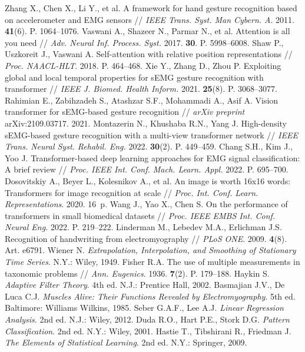 \documentclass[12pt,a4paper]{article}
\begin{document}
\begin{thebibliography}{99}
 Zhang X., Chen X., Li Y., et al. A framework for hand gesture recognition based on accelerometer and EMG sensors // \textit{IEEE Trans. Syst. Man Cybern. A}. 2011. \textbf{41}(6). P. 1064–1076.
 Vaswani A., Shazeer N., Parmar N., et al. Attention is all you need // \textit{Adv. Neural Inf. Process. Syst.} 2017. \textbf{30}. P. 5998–6008.
 Shaw P., Uszkoreit J., Vaswani A. Self-attention with relative position representations // \textit{Proc. NAACL-HLT}. 2018. P. 464–468.
 Xie Y., Zhang D., Zhou P. Exploiting global and local temporal properties for sEMG gesture recognition with transformer // \textit{IEEE J. Biomed. Health Inform.} 2021. \textbf{25}(8). P. 3068–3077.
 Rahimian E., Zabihzadeh S., Atashzar S.F., Mohammadi A., Asif A. Vision transformer for sEMG-based gesture recognition // \textit{arXiv preprint} arXiv:2109.03717. 2021.
 Montazerin N., Khushaba R.N., Yang J. High-density sEMG-based gesture recognition with a multi-view transformer network // \textit{IEEE Trans. Neural Syst. Rehabil. Eng.} 2022. \textbf{30}(2). P. 449–459.
 Chang S.H., Kim J., Yoo J. Transformer-based deep learning approaches for EMG signal classification: A brief review // \textit{Proc. IEEE Int. Conf. Mach. Learn. Appl.} 2022. P. 695–700.
 Dosovitskiy A., Beyer L., Kolesnikov A., et al. An image is worth 16x16 words: Transformers for image recognition at scale // \textit{Proc. Int. Conf. Learn. Representations}. 2020. 16~p.
 Wang J., Yao X., Chen S. On the performance of transformers in small biomedical datasets // \textit{Proc. IEEE EMBS Int. Conf. Neural Eng.} 2022. P. 219–222.
 Linderman M., Lebedev M.A., Erlichman J.S. Recognition of handwriting from electromyography // \textit{PLoS ONE}. 2009. \textbf{4}(8). Art. e6791.
 Wiener N. \textit{Extrapolation, Interpolation, and Smoothing of Stationary Time Series}. N.Y.: Wiley, 1949.
 Fisher R.A. The use of multiple measurements in taxonomic problems // \textit{Ann. Eugenics}. 1936. \textbf{7}(2). P. 179–188.
 Haykin S. \textit{Adaptive Filter Theory}. 4th ed. N.J.: Prentice Hall, 2002.
 Basmajian J.V., De Luca C.J. \textit{Muscles Alive: Their Functions Revealed by Electromyography}. 5th ed. Baltimore: Williams Wilkins, 1985.
 Seber G.A.F., Lee A.J. \textit{Linear Regression Analysis}. 2nd ed. N.J.: Wiley, 2012.
 Duda R.O., Hart P.E., Stork D.G. \textit{Pattern Classification}. 2nd ed. N.Y.: Wiley, 2001.
 Hastie T., Tibshirani R., Friedman J. \textit{The Elements of Statistical Learning}. 2nd ed. N.Y.: Springer, 2009.
\end{thebibliography}
\end{document}
